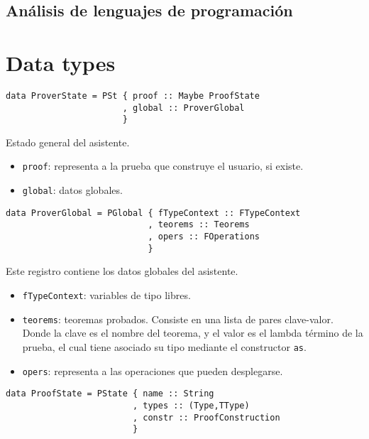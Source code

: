 \documentclass[a4paper,11pt]{article}
\title{}
\author{}
\begin{document}
\maketitle

\begin{center}
\section*{Análisis de lenguajes de programación} 
\end{center}

\newpage{\pagestyle{empty}\cleardoublepage}

\section{Data types}

\begin{verbatim}
data ProverState = PSt { proof :: Maybe ProofState
                       , global :: ProverGlobal
                       }
\end{verbatim}

Estado general del asistente.
\begin{itemize}
  \item \texttt{proof}: representa a la prueba que construye el usuario, si existe.
  \item \texttt{global}: datos globales.
\end{itemize}

\begin{verbatim}
data ProverGlobal = PGlobal { fTypeContext :: FTypeContext
                            , teorems :: Teorems
                            , opers :: FOperations
                            }
\end{verbatim}

Este registro contiene los datos globales del asistente.
\begin{itemize}
  \item \texttt{fTypeContext}: variables de tipo libres.
  \item \texttt{teorems}: teoremas probados. Consiste en una lista de pares clave-valor.
  Donde la clave es el nombre del teorema, y el valor es el lambda término de la prueba,
  el cual tiene asociado su tipo mediante el constructor \texttt{as}.
  \item \texttt{opers}: representa a las operaciones que pueden desplegarse.
\end{itemize}

\begin{verbatim}
data ProofState = PState { name :: String
                         , types :: (Type,TType)
                         , constr :: ProofConstruction
                         }
\end{verbatim}
\end{document}
